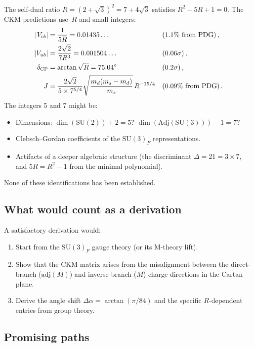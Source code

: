\documentclass[12pt,a4paper]{article}
\newcommand{\SU}{\mathrm{SU}}
\newcommand{\adj}{\mathrm{adj}}
\begin{document}
The self-dual ratio $R = (2+\sqrt{3})^2 = 7 + 4\sqrt{3}$ satisfies
$R^2 - 5R + 1 = 0$.  The CKM predictions use~$R$ and small integers:
\begin{align}
  |V_{cb}| &= \frac{1}{5R} = 0.01435\ldots && (\text{1.1\% from PDG})\,,\\
  |V_{ub}| &= \frac{2\sqrt{2}}{7R^3} = 0.001504\ldots && (\text{0.06}\sigma)\,,\\
  \delta_{\rm CP} &= \arctan\sqrt{R} = 75.04^\circ && (\text{0.2}\sigma)\,,\\
  J &= \frac{2\sqrt{2}}{5 \times 7^{5/4}}
  \sqrt{\frac{m_d(m_s - m_d)}{m_s}}\, R^{-15/4}
  && (\text{0.09\% from PDG})\,.
\end{align}
The integers 5 and 7 might be:
\begin{itemize}
\item Dimensions: $\dim(\SU(2)) + 2 = 5$?
  $\dim(\mathrm{Adj}(\SU(3))) - 1 = 7$?
\item Clebsch--Gordan coefficients of the $\SU(3)_F$ representations.
\item Artifacts of a deeper algebraic structure (the discriminant
  $\Delta = 21 = 3 \times 7$, and $5R = R^2 - 1$ from the minimal
  polynomial).
\end{itemize}
None of these identifications has been established.

\subsection{What would count as a derivation}

A satisfactory derivation would:
\begin{enumerate}
\item Start from the $\SU(3)_F$ gauge theory (or its M-theory lift).
\item Show that the CKM matrix arises from the misalignment between
  the direct-branch ($\adj(M)$) and inverse-branch ($M$) charge
  directions in the Cartan plane.
\item Derive the angle shift $\Delta\alpha = \arctan(\pi/84)$ and the
  specific $R$-dependent entries from group theory.
\end{enumerate}

\subsection{Promising paths}
\end{document}
